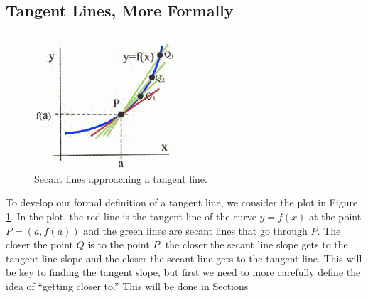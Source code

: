 \subsection{Tangent Lines, More Formally}
\begin{figure}
  \vspace{-20pt}
    \centering
    \includegraphics{img/chap2/image112.png}
    \caption{Secant lines approaching a tangent line.}
\label{fig:2-2-secants}
    \vspace{-10pt}
\end{figure}

To develop our formal definition of a tangent line, we consider the plot in Figure \ref{fig:2-2-secants}. In the plot, the red line is the tangent line of the curve $y=f(x)$ at the point $P = (a, f(a))$ and the green lines are secant lines that go through $P$. The closer the point $Q$ is to the point $P$, the closer the secant line slope gets to the tangent line slope and the closer the secant line gets to the tangent line. This will be key to finding the tangent slope, but first we need to more carefully define the idea of ``getting closer to.'' This will be done in Sections %

